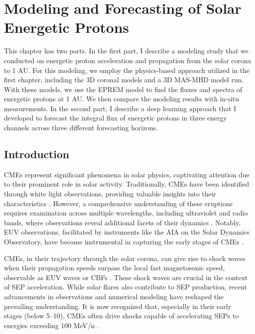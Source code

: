 \chapter{Modeling and Forecasting of Solar Energetic Protons}
\label{chapter4}
This chapter has two parts. In the first part, I describe a modeling study that we conducted on energetic proton acceleration and propagation from the solar corona to 1 AU. For this modeling, we employ the physics-based approach utilized in the first chapter, including the 3D coronal models and a 3D MAS-MHD model run. With these models, we use the EPREM model to find the fluxes and spectra of energetic protons at 1 AU. We then compare the modeling results with in-situ measurements. In the second part, I describe a deep learning approach that I developed to forecast the integral flux of energetic protons in three energy channels across three different forecasting horizons.

\section{Introduction}
\label{sec_ch4_intro}
CMEs represent significant phenomena in solar physics, captivating attention due to their prominent role in solar activity. Traditionally, CMEs have been identified through white light observations, providing valuable insights into their characteristics \citep{vourlidas_2003, zhang_2006, bein_2011}. However, a comprehensive understanding of these eruptions requires examination across multiple wavelengths, including ultraviolet and radio bands, where observations reveal additional facets of their dynamics \citep{bastian_2001, veronig_2010}. Notably, EUV observations, facilitated by instruments like the AIA on the Solar Dynamics Observatory, have become instrumental in capturing the early stages of CMEs \citep{lemen_2012, pesnell_2012}.

CMEs, in their trajectory through the solar corona, can give rise to shock waves when their propagation speeds surpass the local fast magnetosonic speed, observable as EUV waves or CBFs \citep{thompson_1998, long_2011}. These shock waves are crucial in the context of SEP acceleration. While solar flares also contribute to SEP production, recent advancements in observations and numerical modeling have reshaped the prevailing understanding. It is now recognized that, especially in their early stages (below 5–10\rsun), CMEs often drive shocks capable of accelerating SEPs to energies exceeding 100 MeV/n \citep{ontiveross_2009, gopalswamy_2011, battarbee_2013, kozarev_2013, schwadron_2014, kong_2017}.

